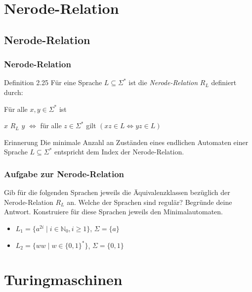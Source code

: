 
\section{Nerode-Relation}
\subsection{Nerode-Relation}
\begin{frame}
 \frametitle{Nerode-Relation}
 \begin{block}{Definition 2.25}
 Für eine Sprache \(L \subseteq \Sigma^*\) ist die \emph{Nerode-Relation} \(R_L\) definiert durch:
  
 Für alle $x, y \in \Sigma^*$ ist 
 \begin{center}$x$ $R_L$ $y$ $\Longleftrightarrow$ für alle $z \in \Sigma^*$ gilt $(xz \in L \Leftrightarrow yz \in L)$
 \end{center}

 \end{block}
  \begin{block}{Erinnerung}
   Die minimale Anzahl an Zuständen eines endlichen Automaten einer Sprache $L \subseteq \Sigma^*$ entspricht dem Index der Nerode-Relation.
  \end{block}
\end{frame}
\begin{frame}
\frametitle{Aufgabe zur Nerode-Relation}
Gib für die folgenden Sprachen jeweils die Äquivalenzklassen bezüglich der Nerode-Relation $R_L$ an. Welche der Sprachen sind regulär? Begründe deine Antwort. Konstruiere für diese Sprachen jeweils den Minimalautomaten.
\begin{itemize}
  \item $L_1 = \{a^{2i} \mid i \in \mathbb{N}_0, i \geq 1\}$, $\Sigma=\{a\}$
  \item $L_2 = \{ww \mid w \in \{0,1\}^*\}$, $\Sigma=\{0,1\}$
\end{itemize}
\end{frame}

\section{Turingmaschinen}
